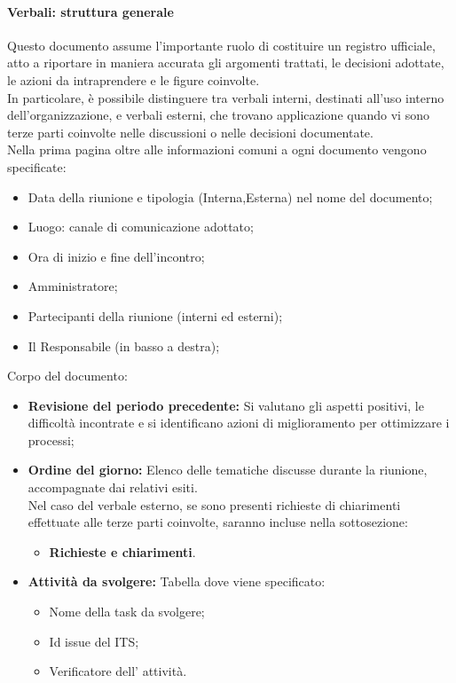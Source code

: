 \documentclass{article}
\begin{document}
\paragraph{Verbali: struttura generale}\label{sec:Verbali}
Questo documento assume l'importante ruolo di costituire un registro ufficiale, atto a riportare in maniera accurata gli argomenti trattati, le decisioni adottate, le azioni da intraprendere e le figure coinvolte.\\
In particolare, è possibile distinguere tra verbali interni, destinati all'uso interno dell'organizzazione, e verbali esterni, che trovano applicazione quando vi sono terze parti coinvolte nelle discussioni o nelle decisioni documentate.\\
Nella prima pagina oltre alle informazioni comuni a ogni documento vengono specificate:
\begin{itemize}
    \item Data della riunione e tipologia (Interna,Esterna) nel nome del documento;
    \item Luogo: canale di comunicazione adottato;
    \item Ora di inizio e fine dell'incontro;
    \item Amministratore;
    \item Partecipanti della riunione (interni ed esterni);
    \item Il Responsabile (in basso a destra);
\end{itemize}
Corpo del documento:
\begin{itemize}
    \item  \textbf{Revisione del periodo precedente:} Si valutano gli aspetti positivi, le difficoltà incontrate e si identificano azioni di miglioramento per ottimizzare i processi;
    \item  \textbf{Ordine del giorno:} Elenco delle tematiche discusse durante la riunione, accompagnate dai relativi esiti.\\
    Nel caso del verbale esterno, se sono presenti richieste di chiarimenti effettuate alle terze parti coinvolte, saranno incluse nella sottosezione:
    \begin{itemize}
        \item \textbf{Richieste e chiarimenti}.
    \end{itemize}
    \item  \textbf{Attività da svolgere:} Tabella dove viene specificato:
          \begin{itemize}
              \item Nome della task da svolgere;
              \item Id issue del ITS;
              \item Verificatore dell' attività.
          \end{itemize}
\end{itemize}
\end{document}
